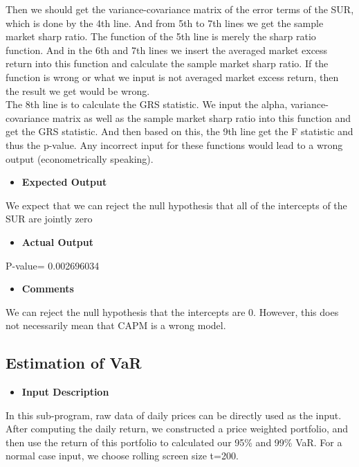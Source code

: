     Then we should get the variance-covariance matrix of the error terms of the SUR, which is done by the 4th line. And from 5th to 7th lines we get the sample market sharp ratio. The function of the 5th line is merely the sharp ratio function. And in the 6th and 7th lines we insert the averaged market excess return into this function and calculate the sample market sharp ratio. If the function is wrong or what we input is not averaged market excess return, then the result we get would be wrong.\\
    The 8th line is to calculate the GRS statistic. We input the alpha, variance-covariance matrix as well as the sample market sharp ratio into this function and get the GRS statistic. And then based on this, the 9th line get the F statistic and thus the p-value. Any incorrect input for these functions would lead to a wrong output (econometrically speaking).\\


    \begin{itemize}
    \item \textbf{Expected Output}
    \end{itemize}
    We expect that we can reject the null hypothesis that all of the intercepts of the SUR are jointly zero\\


    \begin{itemize}
    \item \textbf{Actual Output}
    \end{itemize}
    P-value= 0.002696034\\

    \begin{itemize}
    \item \textbf{Comments}
    \end{itemize}
    We can reject the null hypothesis that the intercepts are $0$. However, this does not necessarily mean that CAPM is a wrong model.\\

    \subsection{Estimation of VaR}
    \begin{itemize}
    \item \textbf{Input Description}
    \end{itemize}
    In this sub-program, raw data of daily prices can be directly used as the input. After computing the daily return, we constructed a price weighted portfolio, and then use the return of this portfolio to calculated our 95\% and 99\% VaR. For a normal case input, we choose rolling screen size t=200.\\

